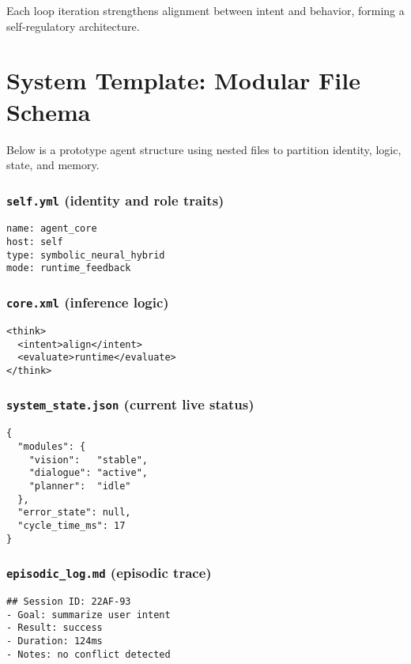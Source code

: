 \documentclass{article}
\begin{document}
Each loop iteration strengthens alignment between intent and behavior, forming a self-regulatory architecture.

\section{System Template: Modular File Schema}
Below is a prototype agent structure using nested files to partition identity, logic, state, and memory.

\subsubsection*{\texttt{self.yml} (identity and role traits)}
\begin{verbatim}
name: agent_core
host: self
type: symbolic_neural_hybrid
mode: runtime_feedback
\end{verbatim}

\subsubsection*{\texttt{core.xml} (inference logic)}
\begin{verbatim}
<think>
  <intent>align</intent>
  <evaluate>runtime</evaluate>
</think>
\end{verbatim}

\subsubsection*{\texttt{system\_state.json} (current live status)}
\begin{verbatim}
{
  "modules": {
    "vision":   "stable",
    "dialogue": "active",
    "planner":  "idle"
  },
  "error_state": null,
  "cycle_time_ms": 17
}
\end{verbatim}

\subsubsection*{\texttt{episodic\_log.md} (episodic trace)}
\begin{verbatim}
## Session ID: 22AF-93
- Goal: summarize user intent
- Result: success
- Duration: 124ms
- Notes: no conflict detected
\end{verbatim}

\end{document}
